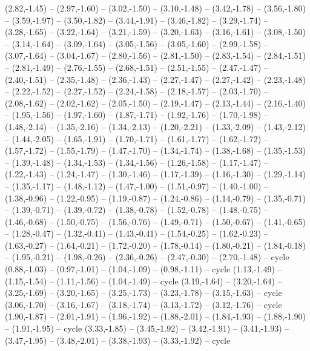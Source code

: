 \expandafter\def\csname geo:gebiet:AK\endcsname{
  (2.82,-1.45) -- (2.97,-1.60) -- (3.02,-1.50) -- (3.10,-1.48) -- (3.42,-1.78) -- (3.56,-1.80) -- (3.59,-1.97) -- (3.50,-1.82) -- (3.44,-1.91) -- (3.46,-1.82) -- (3.29,-1.74) -- (3.28,-1.65) -- (3.22,-1.64) -- (3.21,-1.59) -- (3.20,-1.63) -- (3.16,-1.61) -- (3.08,-1.50) -- (3.14,-1.64) -- (3.09,-1.64) -- (3.05,-1.56) -- (3.05,-1.60) -- (2.99,-1.58) -- (3.07,-1.64) -- (3.04,-1.67) -- (2.80,-1.56) -- (2.81,-1.50) -- (2.83,-1.54) -- (2.84,-1.51) -- (2.81,-1.49) -- (2.76,-1.55) -- (2.68,-1.51) -- (2.51,-1.55) -- (2.47,-1.47) -- (2.40,-1.51) -- (2.35,-1.48) -- (2.36,-1.43) -- (2.27,-1.47) -- (2.27,-1.42) -- (2.23,-1.48) -- (2.22,-1.52) -- (2.27,-1.52) -- (2.24,-1.58) -- (2.18,-1.57) -- (2.03,-1.70) -- (2.08,-1.62) -- (2.02,-1.62) -- (2.05,-1.50) -- (2.19,-1.47) -- (2.13,-1.44) -- (2.16,-1.40) -- (1.95,-1.56) -- (1.97,-1.60) -- (1.87,-1.71) -- (1.92,-1.76) -- (1.70,-1.98) -- (1.48,-2.14) -- (1.35,-2.16) -- (1.34,-2.13) -- (1.20,-2.21) -- (1.33,-2.09) -- (1.43,-2.12) -- (1.44,-2.05) -- (1.65,-1.91) -- (1.70,-1.71) -- (1.61,-1.77) -- (1.62,-1.72) -- (1.57,-1.72) -- (1.55,-1.79) -- (1.47,-1.70) -- (1.34,-1.74) -- (1.38,-1.68) -- (1.35,-1.53) -- (1.39,-1.48) -- (1.34,-1.53) -- (1.34,-1.56) -- (1.26,-1.58) -- (1.17,-1.47) -- (1.22,-1.43) -- (1.24,-1.47) -- (1.30,-1.46) -- (1.17,-1.39) -- (1.16,-1.30) -- (1.29,-1.14) -- (1.35,-1.17) -- (1.48,-1.12) -- (1.47,-1.00) -- (1.51,-0.97) -- (1.40,-1.00) -- (1.38,-0.96) -- (1.22,-0.95) -- (1.19,-0.87) -- (1.24,-0.86) -- (1.14,-0.79) -- (1.35,-0.71) -- (1.39,-0.71) -- (1.39,-0.72) -- (1.38,-0.78) -- (1.52,-0.78) -- (1.48,-0.75) -- (1.46,-0.68) -- (1.50,-0.75) -- (1.56,-0.76) -- (1.49,-0.71) -- (1.50,-0.67) -- (1.41,-0.65) -- (1.28,-0.47) -- (1.32,-0.41) -- (1.43,-0.41) -- (1.54,-0.25) -- (1.62,-0.23) -- (1.63,-0.27) -- (1.64,-0.21) -- (1.72,-0.20) -- (1.78,-0.14) -- (1.80,-0.21) -- (1.84,-0.18) -- (1.95,-0.21) -- (1.98,-0.26) -- (2.36,-0.26) -- (2.47,-0.30) -- (2.70,-1.48) -- cycle
  (0.88,-1.03) -- (0.97,-1.01) -- (1.04,-1.09) -- (0.98,-1.11) -- cycle
  (1.13,-1.49) -- (1.15,-1.54) -- (1.11,-1.56) -- (1.04,-1.49) -- cycle
  (3.19,-1.64) -- (3.20,-1.64) -- (3.25,-1.69) -- (3.20,-1.65) -- (3.25,-1.73) -- (3.23,-1.78) -- (3.15,-1.63) -- cycle
  (3.06,-1.70) -- (3.16,-1.67) -- (3.18,-1.74) -- (3.13,-1.72) -- (3.12,-1.76) -- cycle
  (1.90,-1.87) -- (2.01,-1.91) -- (1.96,-1.92) -- (1.88,-2.01) -- (1.84,-1.93) -- (1.88,-1.90) -- (1.91,-1.95) -- cycle
  (3.33,-1.85) -- (3.45,-1.92) -- (3.42,-1.91) -- (3.41,-1.93) -- (3.47,-1.95) -- (3.48,-2.01) -- (3.38,-1.93) -- (3.33,-1.92) -- cycle}
